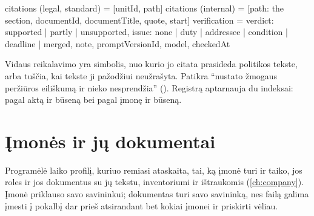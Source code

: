 \begin{codeblock}
citations (legal, standard) = [{unitId, path}]
citations (internal)        = [{path: the section, documentId, documentTitle,
                                quote, start}]
verification = {verdict: supported | partly | unsupported,
                issue: none | duty | addressee | condition | deadline | merged,
                note, promptVersionId, model, checkedAt}
\end{codeblock}

Vidaus reikalavimo  yra simbolis, nuo kurio jo citata prasideda politikos tekste,
arba tuščia, kai tekste ji pažodžiui neužrašyta. Patikra \enquote{nustato žmogaus peržiūros
eiliškumą ir nieko nesprendžia} (). Registrą aptarnauja du indeksai:
pagal aktą ir būseną bei pagal įmonę ir būseną.

\section{Įmonės ir jų dokumentai}\label{sec:data:companies}

Programėlė  laiko profilį, kuriuo remiasi ataskaita, tai, ką įmonė turi ir
taiko, jos roles ir jos dokumentus su jų tekstu, inventoriumi ir ištraukomis
(\cref{ch:company}). Įmonė priklauso savo savininkui; dokumentas turi savo savininką, nes failą
galima įmesti į pokalbį dar prieš atsirandant bet kokiai įmonei ir priskirti vėliau.

